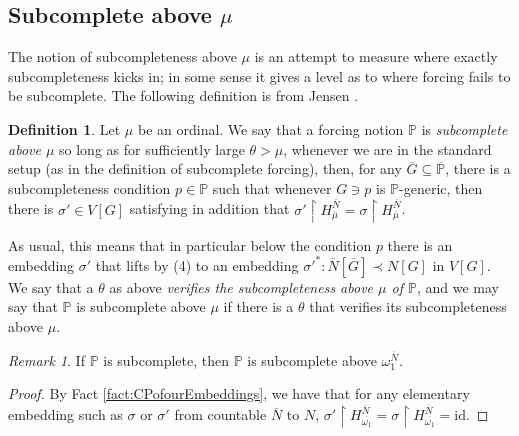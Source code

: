 \documentclass{amsart}
\theoremstyle{definition}
\newtheorem{definition}[theorem]{Definition}
\theoremstyle{remark}
\newtheorem{remark}[theorem]{Remark}
\renewcommand{\P}{\mathbb{P}}
\newcommand{\N}{{\overline{N}}}
\newcommand{\G}{\overline{G}}
\newcommand{\rest}{\mathbin{\upharpoonright}}
\begin{document}
\subsection{Subcomplete above $\mu$} \label{subsec:subcompleteabovemu}
The notion of subcompleteness above $\mu$ is an attempt to measure where exactly subcompleteness kicks in; in some sense it gives a level as to where forcing fails to be subcomplete. 
The following definition is from Jensen \cite[Chapter 2 p.\ 47]{Jensen:2009fe}.
\begin{definition} 
Let $\mu$ be an ordinal. We say that a forcing notion $\P$ is \emph{subcomplete above $\mu$} so long as for sufficiently large $\theta > \mu$, whenever we are in the standard setup (as in the definition of subcomplete forcing),
then, for any $\G \subseteq \overline{\P}$, there is a subcompleteness condition $p \in \P$ such that whenever $G \ni p$ is $\P$-generic, then there is $\sigma' \in V[G]$ satisfying in addition that $\sigma' \rest H_{\overline \mu}^{\N} = \sigma \rest H_{\overline \mu}^{\N}$.

As usual, this means that in particular below the condition $p$ there is an embedding $\sigma'$ that lifts by (4) to an embedding $\sigma'^*:\N[\G] \prec N[G]$ in $V[G]$. We say that a $\theta$ as above \textit{verifies the subcompleteness above $\mu$ of $\P$}, and we may say that $\P$ is subcomplete above \(\mu\) if there is a $\theta$ that verifies its subcompleteness above $\mu$.
\end{definition}

\begin{remark} If $\P$ is subcomplete, then $\P$ is subcomplete above $\omega_1^{\N}$. \end{remark}
\begin{proof} By Fact \ref{fact:CPofourEmbeddings}, we have that for any elementary embedding such as $\sigma$ or $\sigma'$ from countable $\N$ to $N$, $\sigma' \rest H_{\overline{\omega_1}}^{\N} = \sigma \rest H_{\overline{\omega_1}}^{\N} = \text{id}$. \end{proof}
\end{document}
